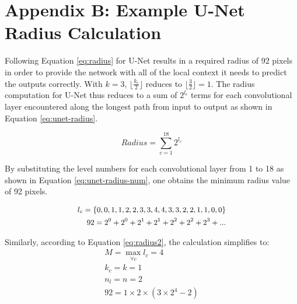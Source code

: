 \section{Appendix B: Example U-Net Radius Calculation}

Following Equation \ref{eq:radius} for U-Net results in a required radius of 92 pixels in order to provide the network with all of the local context it needs to predict the outputs correctly. With $k = 3$, $\lfloor \frac{k_c}{2} \rfloor$ reduces to $\lfloor \frac{3}{2} \rfloor = 1$. The radius computation for U-Net thus reduces to a sum of $2^{l_c}$ terms for each convolutional layer encountered along the longest path from input to output as shown in Equation \ref{eq:unet-radius}. 

\begin{equation}
Radius = \sum_{c=1}^{18} 2^{l_c}
\label{eq:unet-radius}
\end{equation}

By substituting the level numbers for each convolutional layer from 1 to 18 as shown in Equation \ref{eq:unet-radius-num}, one obtains the minimum radius value of 92 pixels. 

\begin{equation}
\begin{small}
\begin{aligned} 
l_c = \{0, 0, 1, 1, 2, 2, 3, 3, 4, 4, 3, 3, 2, 2, 1, 1, 0, 0\} \\
92 = 2^0 + 2^0 + 2^1 + 2^1 + 2^2 + 2^2 + 2^3 + ...
\end{aligned}
\end{small}
\label{eq:unet-radius-num}
\end{equation}

Similarly, according to Equation \ref{eq:radius2}, the calculation simplifies to:
\begin{equation}
\begin{aligned} 
M=\max_{\forall c} { l_c } = 4\\
k_c = k = 1  \\
n_l = n = 2 \\
92 = 1 \times 2 \times (3 \times 2^4 - 2)
\end{aligned}
\label{eq:unet-radius-num2}
\end{equation}



%
